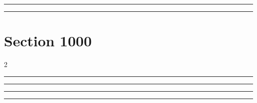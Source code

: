 \documentclass[11pt,a4paper]{article}
\begin{document}
\swarmwrapnext\lipsum[1]\lipsum[2]
\begin{swarmwrap}%
  \begin{minipage}[t]{4cm}
    \centering
    \textcolor{red!20}{\rule{\linewidth}{10cm}}
  \end{minipage}%
\end{swarmwrap}%
\swarmwrapnext\lipsum[1]\lipsum[2]\lipsum[3]
\begin{swarmwrap}%
  \begin{minipage}[t]{5cm}
    \centering
    \textcolor{red!20}{\rule{\linewidth}{2cm}}
  \end{minipage}%
\end{swarmwrap}%
\swarmwrapnext\lipsum[1]\lipsum[2]\lipsum[3]\lipsum[4]
\section{Section 1000}
\begin{multicols}{2}
\begin{swarmwrap}%
  \begin{minipage}[t]{2cm}
    \centering
    \textcolor{blue!30}{\rule{\linewidth}{3cm}}
  \end{minipage}%
\end{swarmwrap}%
\swarmwrapnext\lipsum[1]\lipsum[2]
\end{multicols}
\begin{swarmwrap}%
  \begin{minipage}[t]{3cm}
    \centering
    \textcolor{red!20}{\rule{\linewidth}{4cm}}
  \end{minipage}%
\end{swarmwrap}%
\swarmwrapnext\lipsum[1]\lipsum[2]\lipsum[3]\lipsum[4]\lipsum[5]\lipsum[6]
\begin{swarmwrap}%
  \begin{minipage}[t]{4cm}
    \centering
    \textcolor{red!20}{\rule{\linewidth}{5cm}}
  \end{minipage}%
\end{swarmwrap}%
\swarmwrapnext\lipsum[1]
\begin{swarmwrap}%
  \begin{minipage}[t]{5cm}
    \centering
    \textcolor{red!20}{\rule{\linewidth}{6cm}}
  \end{minipage}%
\end{swarmwrap}%
\end{document}
